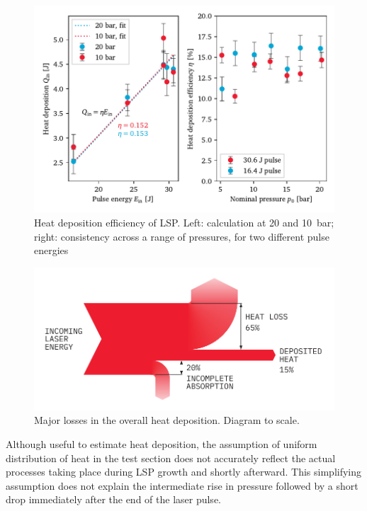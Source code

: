             \begin{figure}[h]
                \centering
                \includegraphics[]{assets/5 results/heatEfficiency}
                \caption[Heat deposition efficiency of LSP]{Heat deposition efficiency of LSP. Left: calculation at 20 and 10~bar; right: consistency across a range of pressures, for two different pulse energies}
                \label{fig:heatEfficiency}
            \end{figure}

            \begin{figure}[h]
                \centering
                \includegraphics[]{assets/5 results/heatdep_contribs.pdf}
                \caption{Major losses in the overall heat deposition. Diagram to scale.}
                \label{fig:heatdep_sankey}
            \end{figure}

            Although useful to estimate heat deposition, the assumption of uniform distribution of heat in the test section does not accurately reflect the actual processes taking place during LSP growth and shortly afterward. This simplifying assumption does not explain the intermediate rise in pressure followed by a short drop immediately after the end of the laser pulse.

